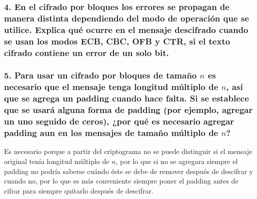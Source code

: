 \documentclass[12pt]{article}
\begin{document}
\subsubsection*{4. En el cifrado por bloques los errores se propagan de manera distinta dependiendo del modo de operación que se utilice. Explica qué ocurre en el mensaje descifrado cuando se usan los modos ECB, CBC, OFB y CTR, si el texto cifrado contiene un error de un solo bit.}


\subsubsection*{5. Para usar un cifrado por bloques de tamaño $n$ es necesario que el mensaje tenga longitud múltiplo de $n$, así que se agrega un padding cuando hace falta. Si se establece que se usará alguna forma de padding (por ejemplo, agregar un uno seguido de ceros), ¿por qué es necesario agregar padding aun en los mensajes de tamaño múltiplo de $n$?}
Es necesario porque a partir del criptograma no se puede distinguir si el mensaje original tenía longitud múltiplo de $n$, por lo que si no se agregara siempre el padding no podría saberse cuándo éste se debe de remover después de descifrar y cuando no, por lo que es más conveniente siempre poner el padding antes de cifrar para siempre quitarlo después de descifrar.
\end{document}
